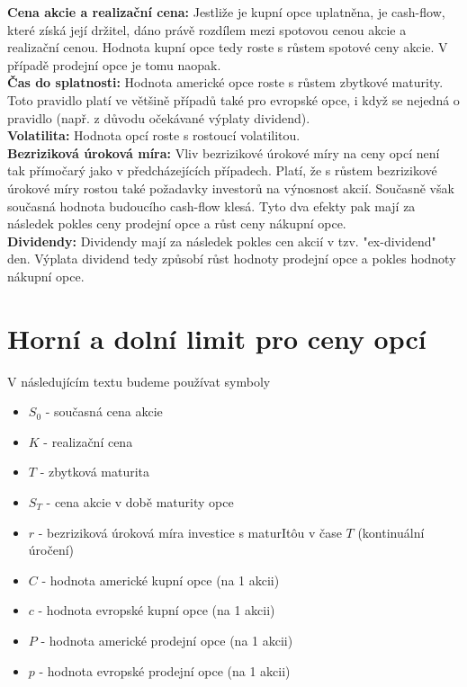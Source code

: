 \documentclass[a4paper]{book}
\begin{document}
\noindent \textbf{Cena akcie a realizační cena:} Jestliže je kupní opce uplatněna, je cash-flow, které získá její držitel, dáno právě rozdílem mezi spotovou cenou akcie a realizační cenou. Hodnota kupní opce tedy roste s růstem spotové ceny akcie. V případě prodejní opce je tomu naopak.\\
\noindent \textbf{Čas do splatnosti:} Hodnota americké opce roste s růstem zbytkové maturity. Toto pravidlo platí ve většině případů také pro evropské opce, i když se nejedná o pravidlo (např. z důvodu očekávané výplaty dividend).\\
\noindent \textbf{Volatilita:} Hodnota opcí roste s rostoucí volatilitou.\\
\noindent \textbf{Bezriziková úroková míra:} Vliv bezrizikové úrokové míry na ceny opcí není tak přímočarý jako v předcházejících případech. Platí, že s růstem bezrizikové úrokové míry rostou také požadavky investorů na výnosnost akcií. Současně však současná hodnota budoucího cash-flow klesá. Tyto dva efekty pak mají za následek pokles ceny prodejní opce a růst ceny nákupní opce.\\
\noindent \textbf{Dividendy:} Dividendy mají za následek pokles cen akcií v tzv. "ex-dividend" den. Výplata dividend tedy způsobí růst hodnoty prodejní opce a pokles hodnoty nákupní opce.\\

\section{Horní a dolní limit pro ceny opcí}

V následujícím textu budeme používat symboly
\begin{itemize}
\item $S_0$ - současná cena akcie
\item $K$ - realizační cena
\item $T$ - zbytková maturita
\item $S_T$ - cena akcie v době maturity opce
\item $r$ - bezriziková úroková míra investice s maturIt\^ou v čase $T$ (kontinuální úročení)
\item $C$ - hodnota americké kupní opce (na 1 akcii)
\item $c$ - hodnota evropské kupní opce (na 1 akcii)
\item $P$ - hodnota americké prodejní opce (na 1 akcii)
\item $p$ - hodnota evropské prodejní opce (na 1 akcii)
\end {itemize}
\end{document}
